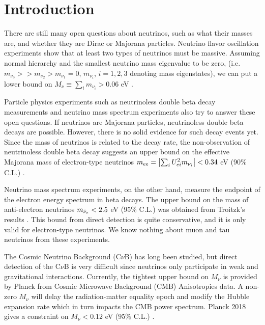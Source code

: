 
\section{Introduction}
\label{sec:intro}
There are still many open questions about neutrinos, such as what their masses are, and whether they are Dirac or Majorana particles. 
Neutrino flavor oscillation experiments show that at least two types of neutrinos must be massive. Assuming normal hierarchy and the smallest neutrino mass eigenvalue to be zero, (i.e. $m_{\nu_3} >> m_{\nu_2} > m_{\nu_1}=0$, $m_{\nu_i}$, $i=1,2,3$ denoting mass eigenstates), we can put a lower bound on $M_\nu \equiv \sum_i m_{\nu_i} > 0.06$ eV \cite{PP}.


Particle physics experiments such as neutrinoless double beta decay measurements and neutrino mass spectrum experiments also try to answer these open questions. If neutrinos are Majorana particles, neutrinoless double beta decays are possible.
However, there is no solid evidence for such decay events yet. Since the mass of neutrinos is related to the decay rate, the non-observation of neutrinoless double beta decay suggests an upper bound on the effective Majorana mass of electron-type neutrinos $m_{ee}=\abs{\sum_i U_{ei}^2 m_{\nu_i}}<0.34$ eV (90\% C.L.) \cite{FARZAN200159}.

Neutrino mass spectrum experiments, on the other hand, measure the endpoint of the electron energy spectrum in beta decays. The upper bound on the mass of anti-electron neutrinos $m_{\Bar{\nu}_e} < 2.5$ eV (95\% C.L.) was obtained from Troitzk's results \cite{PP}. 
This bound from direct detection is quite conservative, and it is only valid for electron-type neutrinos. 
We know nothing about muon and tau neutrinos from these experiments.

The Cosmic Neutrino Background (C$\nu$B) has long been studied, but direct detection of the C$\nu$B is very difficult since neutrinos only participate in weak and gravitational interactions. Currently, the tightest upper bound on $M_\nu$ is provided by Planck from Cosmic Microwave Background (CMB) Anisotropies data. 
A non-zero $M_\nu$ will delay the radiation-matter equality epoch and modify the Hubble expansion rate which in turn impacts the CMB power spectrum. Planck 2018 gives a constraint on $M_\nu<0.12$ eV (95\% C.L.) \cite{Planck2018,M nu}.

